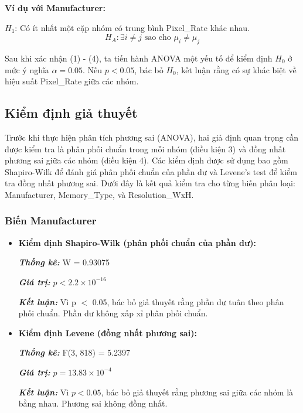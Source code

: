 \textbf{Ví dụ với Manufacturer:}

$H_1$: Có ít nhất một cặp nhóm có trung bình Pixel\_Rate khác nhau.
$$H_A: \exists i \neq j \text{ sao cho } \mu_i \neq \mu_j
$$

Sau khi xác nhận (1) - (4), ta tiến hành ANOVA một yếu tố để kiểm định $H_0$ ở mức ý nghĩa $\alpha=0.05$. Nếu $p < 0.05$, bác bỏ $H_0$, kết luận rằng có sự khác biệt về hiệu suất Pixel\_Rate giữa các nhóm.
\subsection{Kiểm định giả thuyết}
Trước khi thực hiện phân tích phương sai (ANOVA), hai giả định quan trọng cần được kiểm tra là phân phối chuẩn trong mỗi nhóm (điều kiện 3) và đồng nhất phương sai giữa các nhóm (điều kiện 4). Các kiểm định được sử dụng bao gồm Shapiro-Wilk để đánh giá phân phối chuẩn của phần dư và Levene’s test để kiểm tra đồng nhất phương sai. Dưới đây là kết quả kiểm tra cho từng biến phân loại: Manufacturer, Memory\_Type, và Resolution\_WxH.

\subsubsection{Biến Manufacturer}
\begin{itemize}
    \item \textbf{Kiểm định Shapiro-Wilk (phân phối chuẩn của phần dư):}
    
    \textbf{\textit{Thống kê:}} W = 0.93075
    
    \textbf{\textit{Giá trị:}} $p<2.2 \times10^{-16} $
    
    \textbf{\textit{Kết luận:}} Vì p $<$ 0.05, bác bỏ giả thuyết  rằng phần dư tuân theo phân phối chuẩn. Phần dư không xấp xỉ phân phối chuẩn.
    \item \textbf{Kiểm định Levene (đồng nhất phương sai):}
    
    \textit{\textbf{Thống kê:}} F(3, 818) = 5.2397

   \textit{\textbf{Giá trị:}} $p = 13.83 \times10^{-4} $
    
   \textit{\textbf{Kết luận:}} Vì $p < 0.05$, bác bỏ giả thuyết  rằng phương sai giữa các nhóm là bằng nhau. Phương sai không đồng nhất.
\end{itemize}

